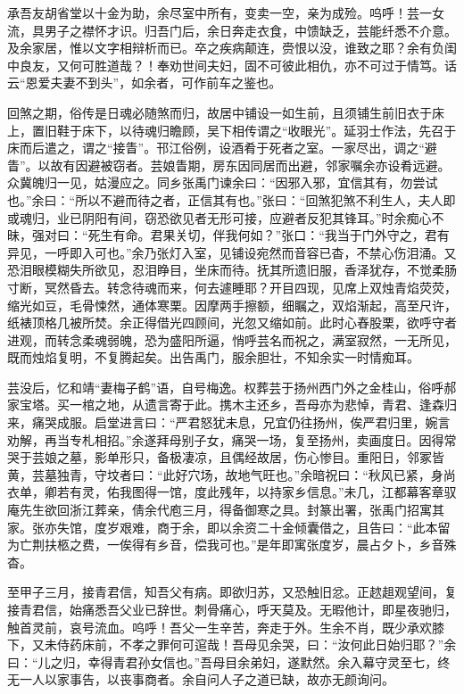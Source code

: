 \documentclass[]{article}
\begin{document}
承吾友胡省堂以十金为助，余尽室中所有，变卖一空，亲为成殓。呜呼！芸一女流，具男子之襟怀才识。归吾门后，余日奔走衣食，中馈缺乏，芸能纤悉不介意。及余家居，惟以文字相辩析而已。卒之疾病颠连，赍恨以没，谁致之耶？余有负闺中良友，又何可胜道哉？！奉劝世间夫妇，固不可彼此相仇，亦不可过于情笃。话云``恩爱夫妻不到头''，如余者，可作前车之鉴也。

回煞之期，俗传是日魂必随煞而归，故居中铺设一如生前，且须铺生前旧衣于床上，置旧鞋于床下，以待魂归瞻顾，吴下相传谓之``收眼光''。延羽士作法，先召于床而后遣之，谓之``接眚''。邗江俗例，设酒肴于死者之室。一家尽出，调之``避眚''。以故有因避被窃者。芸娘眚期，房东因同居而出避，邻家嘱余亦设肴远避。众冀魄归一见，姑漫应之。同乡张禹门谏余曰：``因邪入邪，宜信其有，勿尝试也。''余曰：``所以不避而待之者，正信其有也。''张曰：``回煞犯煞不利生人，夫人即或魂归，业已阴阳有间，窃恐欲见者无形可接，应避者反犯其锋耳。''时余痴心不昧，强对曰：``死生有命。君果关切，伴我何如？''张口：``我当于门外守之，君有异见，一呼即入可也。''余乃张灯入室，见铺设宛然而音容已杳，不禁心伤泪涌。又恐泪眼模糊失所欲见，忍泪睁目，坐床而待。抚其所遗旧服，香泽犹存，不觉柔肠寸断，冥然昏去。转念待魂而来，何去遽睡耶？开目四现，见席上双烛青焰荧荧，缩光如豆，毛骨悚然，通体寒栗。因摩两手擦额，细瞩之，双焰渐起，高至尺许，纸裱顶格几被所焚。余正得借光四顾间，光忽又缩如前。此时心舂股栗，欲呼守者进观，而转念柔魂弱魄，恐为盛阳所逼，悄呼芸名而祝之，满室寂然，一无所见，既而烛焰复明，不复腾起矣。出告禹门，服余胆壮，不知余实一时情痴耳。

芸没后，忆和靖``妻梅子鹤''语，自号梅逸。权葬芸于扬州西门外之金桂山，俗呼郝家宝塔。买一棺之地，从遗言寄于此。携木主还乡，吾母亦为悲悼，青君、逢森归来，痛哭成服。启堂进言曰：``严君怒犹未息，兄宜仍往扬州，俟严君归里，婉言劝解，再当专札相招。''余遂拜母别子女，痛哭一场，复至扬州，卖画度日。因得常哭于芸娘之墓，影单形只，备极凄凉，且偶经故居，伤心惨目。重阳日，邻冢皆黄，芸墓独青，守坟者曰：``此好穴场，故地气旺也。''余暗祝曰：``秋风已紧，身尚衣单，卿若有灵，佑我图得一馆，度此残年，以持家乡信息。''未几，江都幕客章驭庵先生欲回浙江葬亲，倩余代庖三月，得备御寒之具。封篆出署，张禹门招寓其家。张亦失馆，度岁艰难，商于余，即以余资二十金倾囊借之，且告曰：``此本留为亡荆扶柩之费，一俟得有乡音，偿我可也。''是年即寓张度岁，晨占夕卜，乡音殊杳。

至甲子三月，接青君信，知吾父有病。即欲归苏，又恐触旧忿。正趑趄观望间，复接青君信，始痛悉吾父业已辞世。刺骨痛心，呼天莫及。无暇他计，即星夜驰归，触首灵前，哀号流血。呜呼！吾父一生辛苦，奔走于外。生余不肖，既少承欢膝下，又未侍药床前，不孝之罪何可逭哉！吾母见余哭，曰：``汝何此日始归耶？''余曰：``儿之归，幸得青君孙女信也。''吾母目余弟妇，遂默然。余入幕守灵至七，终无一人以家事告，以丧事商者。余自问人子之道已缺，故亦无颜询问。
\end{document}
